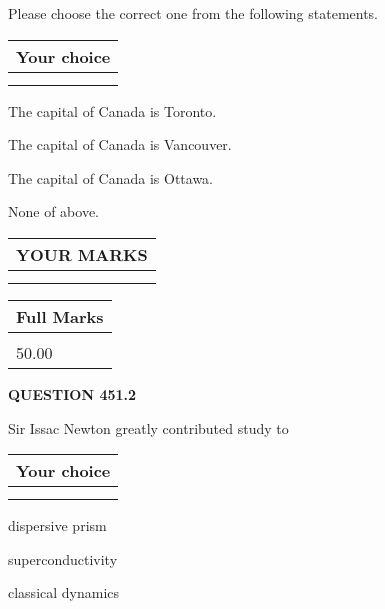 \documentclass[12pt]{article}
\begin{document}
  
Please choose the correct one from the following statements.
  
  
\noindent\hspace{3.0in} \begin{tabular}{|l|}
\hline
Your choice \\
\hline
 \\ 
 \\ 
\hline
\end{tabular}
  
  
 
 
The capital of Canada is Toronto.
 
 
The capital of Canada is Vancouver.
 
 
The capital of Canada is Ottawa.
 
 
 None of above.
 
 
  
\vspace{0.2in}
  
\noindent\begin{tabular}{|l|}
\hline
 YOUR MARKS  \\
\hline
 \\ 
 \\ 
\hline
\end{tabular}
\hspace{0.05in} \begin{tabular}{|l|}
\hline
 Full Marks  \\
\hline
 \\ 
50.00 \\
\hline
\end{tabular}
{\textbf{\Large{QUESTION
451.2 
}}}
  
  
Sir Issac Newton greatly contributed study to
  
  
\noindent\hspace{3.0in} \begin{tabular}{|l|}
\hline
Your choice \\
\hline
 \\ 
 \\ 
\hline
\end{tabular}
  
  
 
 
dispersive prism
 
 
superconductivity
 
 
classical dynamics
 
\end{document}

